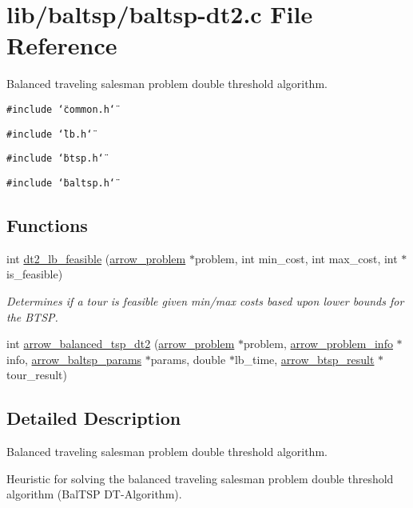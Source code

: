 \hypertarget{lib_2baltsp_2baltsp-dt2_8c}{
\section{lib/baltsp/baltsp-dt2.c File Reference}
\label{lib_2baltsp_2baltsp-dt2_8c}
}
Balanced traveling salesman problem double threshold algorithm.  


{\tt \#include \char`\"{}common.h\char`\"{}}\par
{\tt \#include \char`\"{}lb.h\char`\"{}}\par
{\tt \#include \char`\"{}btsp.h\char`\"{}}\par
{\tt \#include \char`\"{}baltsp.h\char`\"{}}\par
\subsection*{Functions}
\begin{CompactItemize}
\item 
int \hyperlink{lib_2baltsp_2baltsp-dt2_8c_f6f20f6ccad84917d1405ed863e35b7f}{dt2\_\-lb\_\-feasible} (\hyperlink{structarrow__problem}{arrow\_\-problem} $\ast$problem, int min\_\-cost, int max\_\-cost, int $\ast$is\_\-feasible)
\begin{CompactList}\small\item\em Determines if a tour is feasible given min/max costs based upon lower bounds for the BTSP. \item\end{CompactList}\item 
int \hyperlink{lib_2baltsp_2baltsp-dt2_8c_9e38b4149294169d7385216213f247fe}{arrow\_\-balanced\_\-tsp\_\-dt2} (\hyperlink{structarrow__problem}{arrow\_\-problem} $\ast$problem, \hyperlink{structarrow__problem__info}{arrow\_\-problem\_\-info} $\ast$info, \hyperlink{structarrow__baltsp__params}{arrow\_\-baltsp\_\-params} $\ast$params, double $\ast$lb\_\-time, \hyperlink{structarrow__btsp__result}{arrow\_\-btsp\_\-result} $\ast$tour\_\-result)
\end{CompactItemize}


\subsection{Detailed Description}
Balanced traveling salesman problem double threshold algorithm. 

Heuristic for solving the balanced traveling salesman problem double threshold algorithm (BalTSP DT-Algorithm).

